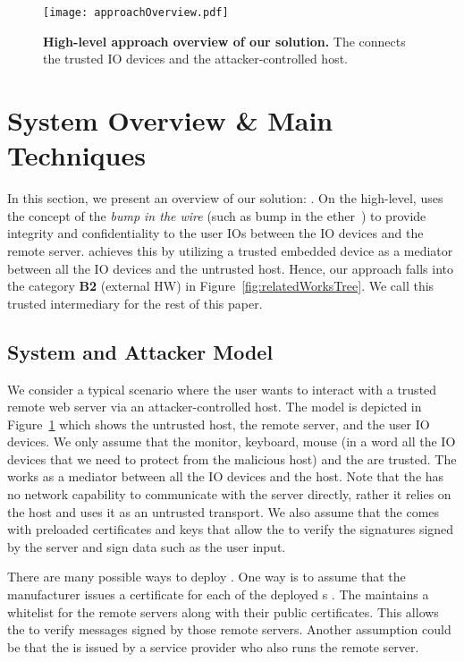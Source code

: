 \begin{figure}[t]
\centering
\texttt{[image: approachOverview.pdf]}
\caption{\textbf{High-level approach overview of our solution.}  The \device connects the trusted IO devices and the attacker-controlled host. 
}
\spacesave
\label{fig:approachOverview}
\centering
\end{figure}

\section{System Overview \& Main Techniques}
\label{sec:approach}

In this section, we present an overview of our solution: \name. On the high-level, \name uses the concept of the \emph{bump in the wire} (such as bump in the ether~\cite{McCPerRei2006}) to provide integrity and confidentiality to the user IO{}s between the IO devices and the remote server. \name achieves this by utilizing a trusted embedded device as a mediator between all the IO devices and the untrusted host. Hence, our approach falls into the category \textbf{B2} (external HW) in Figure~\ref{fig:relatedWorksTree}. 
We call this trusted intermediary \device for the rest of this paper.   


\subsection{System and Attacker Model}
\label{sec:approach:systemAttackerModel}

We consider a typical scenario where the user wants to interact with a trusted remote web server via an attacker-controlled host. The model is depicted in Figure~\ref{fig:approachOverview} which shows the untrusted host, the remote server, and the user IO devices. We only assume that the monitor, keyboard, mouse (in a word all the IO devices that we need to protect from the malicious host) and the \device are trusted. The \device works as a mediator between all the IO devices and the host. Note that the \device has no network capability to communicate with the server directly, rather it relies on the host and uses it as an untrusted transport. We also assume that the \device comes with preloaded certificates and keys that allow the \device to verify the signatures signed by the server and sign data such as the user input.

There are many possible ways to deploy \name. One way is to assume that the \device manufacturer issues a certificate for each of the deployed \device{}s . The \device maintains a whitelist for the remote servers along with their public certificates. This allows the \device to verify messages signed by those remote servers. Another assumption could be that the \device is issued by a service provider who also runs the remote server. 

